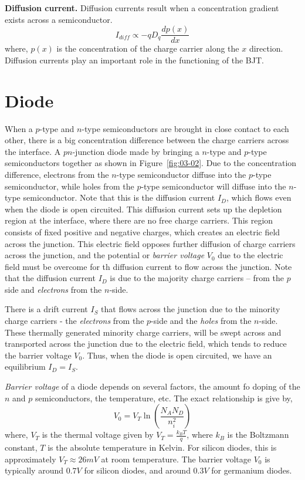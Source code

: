 \noindent\textbf{Diffusion current.} Diffusion currents result when a concentration gradient exists across a semiconductor.
\begin{equation}
    I_{diff} \propto -q D_q \frac{d p\left(x\right)}{dx}
    \label{eq:ch03-diff-current}
\end{equation}
where, $p\left(x\right)$ is the concentration of the charge carrier along the $x$ direction. Diffusion currents play an important role in the functioning of the BJT.

\section{Diode}
When a  $p$-type and $n$-type semiconductors are brought in close contact to each other, there is a big concentration difference between the charge carriers across the interface. A $pn$-junction diode made by bringing a $n$-type and $p$-type semiconductors together as shown in Figure~\ref{fig:03-02}. Due to the concentration difference, electrons from the $n$-type semiconductor diffuse into the $p$-type semiconductor, while holes from the $p$-type semiconductor will diffuse into the $n$-type semiconductor. Note that this is the diffusion current $I_D$, which flows even when the diode is open circuited. This diffusion current sets up the depletion region at the interface, where there are no free charge carriers. This region consists of fixed positive and negative charges, which creates an electric field across the junction. This electric field opposes further diffusion of charge carriers across the junction, and the potential or \textit{barrier voltage} $V_0$ due to the electric field must be overcome for th diffusion current to flow across the junction. Note that the diffusion current $I_D$ is due to the majority charge carriers --  from the $p$ side and \textit{electrons} from the $n$-side.

There is a drift current $I_S$ that flows across the junction due to the minority charge carriers - the \textit{electrons} from the $p$-side and the \textit{holes} from the $n$-side. These thermally generated minority charge carriers, will be swept across and transported across the junction due to the electric field, which tends to reduce the barrier voltage $V_0$. Thus, when the diode is open circuited, we have an equilibrium $I_D = I_S$.

\noindent\textit{Barrier voltage} of a diode depends on several factors, the amount fo doping of the $n$ and $p$ semiconductors, the temperature, etc. The exact relationship is give by,
\begin{equation}
    V_0 = V_T \ln\left(\frac{N_A N_D}{n_i^2}\right)
    \label{eq:ch03-barrier-volt}
\end{equation}
where, $V_T$ is the thermal voltage given by $V_T = \frac{k_B T}{q}$, where $k_B$ is the Boltzmann constant, $T$ is the absolute temperature in Kelvin. For silicon diodes, this is approximately $V_T \approx 26 mV$ at room temperature. The barrier voltage $V_0$ is typically around $0.7 V$ for silicon diodes, and around $0.3 V$ for germanium diodes.

